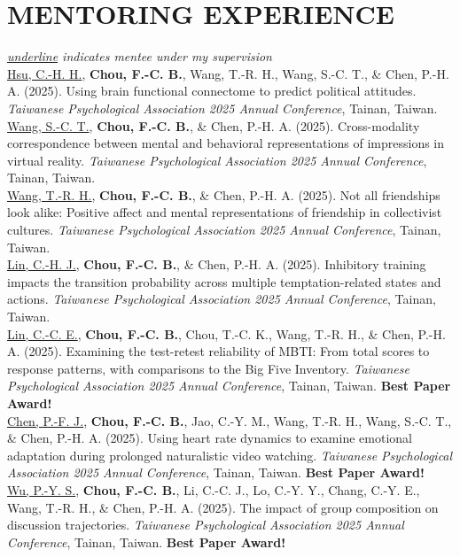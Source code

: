 \documentclass[a4paper,12pt]{article}
\newcommand{\sectionspace}{0pt} %
\newcommand{\itemspace}{7pt} %
\begin{document}
\vspace{\sectionspace}

\section*{MENTORING EXPERIENCE}
\textit{\underline{underline} indicates mentee under my supervision} \\[10pt]
\noindent \underline{Hsu, C.-H. H.}, \textbf{Chou, F.-C. B.}, Wang, T.-R. H., Wang, S.-C. T., \& Chen, P.-H. A. (2025). Using brain functional connectome to predict political attitudes. \textit{Taiwanese Psychological Association 2025 Annual Conference}, Tainan, Taiwan. \\[\itemspace]
\noindent \underline{Wang, S.-C. T.}, \textbf{Chou, F.-C. B.}, \& Chen, P.-H. A. (2025). Cross-modality correspondence between mental and behavioral representations of impressions in virtual reality. \textit{Taiwanese Psychological Association 2025 Annual Conference}, Tainan, Taiwan. \\[\itemspace]
\noindent \underline{Wang, T.-R. H.}, \textbf{Chou, F.-C. B.}, \& Chen, P.-H. A. (2025). Not all friendships look alike: Positive affect and mental representations of friendship in collectivist cultures. \textit{Taiwanese Psychological Association 2025 Annual Conference}, Tainan, Taiwan. \\[\itemspace]
\noindent \underline{Lin, C.-H. J.}, \textbf{Chou, F.-C. B.}, \& Chen, P.-H. A. (2025). Inhibitory training impacts the transition probability across multiple temptation-related states and actions. \textit{Taiwanese Psychological Association 2025 Annual Conference}, Tainan, Taiwan. \\[\itemspace]
\noindent \underline{Lin, C.-C. E.}, \textbf{Chou, F.-C. B.}, Chou, T.-C. K., Wang, T.-R. H., \& Chen, P.-H. A. (2025). Examining the test-retest reliability of MBTI: From total scores to response patterns, with comparisons to the Big Five Inventory. \textit{Taiwanese Psychological Association 2025 Annual Conference}, Tainan, Taiwan. \textbf{Best Paper Award!} \\[\itemspace]
\noindent \underline{Chen, P.-F. J.}, \textbf{Chou, F.-C. B.}, Jao, C.-Y. M., Wang, T.-R. H., Wang, S.-C. T., \& Chen, P.-H. A. (2025). Using heart rate dynamics to examine emotional adaptation during prolonged naturalistic video watching. \textit{Taiwanese Psychological Association 2025 Annual Conference}, Tainan, Taiwan.  \textbf{Best Paper Award!} \\[\itemspace]
\noindent \underline{Wu, P.-Y. S.}, \textbf{Chou, F.-C. B.}, Li, C.-C. J., Lo, C.-Y. Y., Chang, C.-Y. E., Wang, T.-R. H., \& Chen, P.-H. A. (2025). The impact of group composition on discussion trajectories. \textit{Taiwanese Psychological Association 2025 Annual Conference}, Tainan, Taiwan. \textbf{Best Paper Award!} \\[\itemspace]
\end{document}

